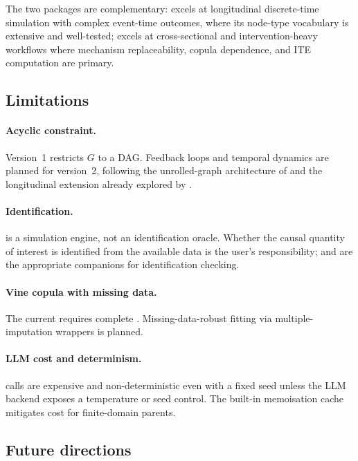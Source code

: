 \documentclass[article]{jss}
\begin{document}
The two packages are complementary:  excels at longitudinal
discrete-time simulation with complex event-time outcomes, where its node-type
vocabulary is extensive and well-tested;  excels at
cross-sectional and intervention-heavy workflows where mechanism replaceability,
copula dependence, and ITE computation are primary.

\subsection{Limitations}

\paragraph{Acyclic constraint.} Version~1 restricts $G$ to a DAG. Feedback loops
and temporal dynamics are planned for version~2, following the unrolled-graph
architecture of \citet{bongers2021foundations} and the longitudinal extension
already explored by .

\paragraph{Identification.}  is a simulation engine, not an
identification oracle. Whether the causal quantity of interest is identified from
the available data is the user's responsibility;  \citep{textor2016dagitty}
and  \citep{tikka2022cfid} are the appropriate companions for
identification checking.

\paragraph{Vine copula with missing data.} The current 
requires complete . Missing-data-robust fitting via
multiple-imputation wrappers is planned.

\paragraph{LLM cost and determinism.}  calls are expensive
and non-deterministic even with a fixed seed unless the LLM backend exposes a
temperature or seed control. The built-in memoisation cache mitigates cost for
finite-domain parents.

\subsection{Future directions}
\end{document}
